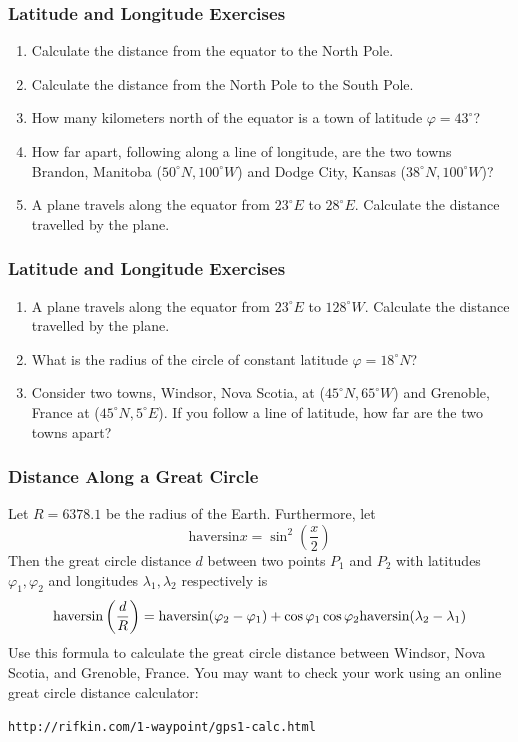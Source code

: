 \documentclass[xcolor=dvipsnames]{beamer}
\begin{document}
\begin{frame}
  \frametitle{Latitude and Longitude Exercises}
\begin{enumerate}
\item<1-> Calculate the distance from the equator to the North Pole.
\item<2-> Calculate the distance from the North Pole to the South
  Pole.
\item<3-> How many kilometers north of the equator is a town of
  latitude $\varphi=43^{\circ}$?
\item<4-> How far apart, following along a line of longitude, are the two
  towns Brandon, Manitoba ($50^{\circ}N,100^{\circ}W$) and Dodge City, Kansas
  ($38^{\circ}N,100^{\circ}W$)?
\item<5-> A plane travels along the equator from $23^{\circ}E$ to $28^{\circ}E$.
  Calculate the distance travelled by the plane.
\end{enumerate}
\end{frame}

\begin{frame}
  \frametitle{Latitude and Longitude Exercises}
\begin{enumerate}
\item<1-> A plane travels along the equator from $23^{\circ}E$ to
  $128^{\circ}W$. Calculate the distance travelled by the plane.
\item<2-> What is the radius of the circle of constant latitude
  $\varphi=18^{\circ}N$?
\item<3-> Consider two towns, Windsor, Nova Scotia, at
  ($45^{\circ}N,65^{\circ}W$) and Grenoble, France at
  ($45^{\circ}N,5^{\circ}E$). If you follow a line of latitude, how
  far are the two towns apart?
\end{enumerate}
\end{frame}

\begin{frame}
  \frametitle{Distance Along a Great Circle}
  Let $R=6378.1$ be the radius of the Earth. Furthermore, let
  \begin{equation}
    \label{eq:ohheibif}
    \mbox{haversin}{}x=\sin^{2}\left(\frac{x}{2}\right)
  \end{equation}
  Then the great circle distance $d$ between two points $P_{1}$ and
  $P_{2}$ with latitudes $\varphi_{1},\varphi_{2}$ and longitudes
  $\lambda_{1},\lambda_{2}$ respectively is
  \begin{equation}
    \label{eq:ohpishah}
    \mbox{haversin}\left(\frac{d}{R}\right)=\mbox{haversin}(\varphi_{2}-\varphi_{1})+\cos\varphi_{1}\cos\varphi_{2}\mbox{haversin}(\lambda_{2}-\lambda_{1})\notag
  \end{equation}
  Use this formula to calculate the great circle distance between
  Windsor, Nova Scotia, and Grenoble, France. You may want to check
  your work using an online great circle distance calculator:
  \begin{center}
    \texttt{http://rifkin.com/1-waypoint/gps1-calc.html}
  \end{center}
\end{frame}
\end{document}
